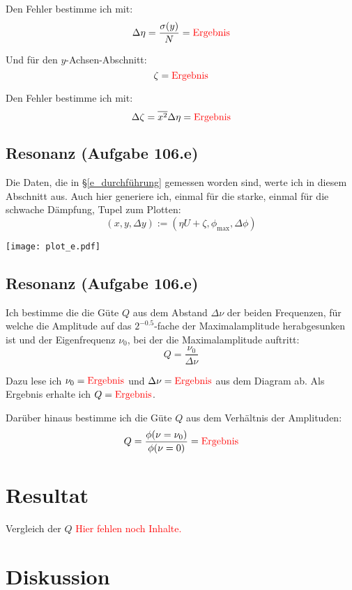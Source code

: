 \documentclass[11pt]{article}
\newcommand{\ergebnis}{\textcolor{red}{\mathrm{Ergebnis}}}
\newcommand{\fehlt}{\textcolor{red}{Hier fehlen noch Inhalte.}}
\begin{document}
Den Fehler bestimme ich mit:
\[ \Delta \eta = \frac{\sigma (y)}{N} = \ergebnis \]

Und für den $y$-Achsen-Abschnitt:
\[ \zeta = \ergebnis \]

Den Fehler bestimme ich mit:
\[ \Delta \zeta = \overline{x^2} \Delta \eta = \ergebnis \]

\subsection{Resonanz (Aufgabe 106.e)}
\label{e_auswertung}

Die Daten, die in §\ref{e_durchführung} gemessen worden sind, werte ich in
diesem Abschnitt aus. Auch hier generiere ich, einmal für die starke, einmal
für die schwache Dämpfung, Tupel zum Plotten:
\[ (x, y, \Delta y) := \left( \eta U + \zeta, \phi_\mathrm{max}, \Delta \phi \right) \]

\texttt{[image: plot\_e.pdf]}

\subsection{Resonanz (Aufgabe 106.e)}

Ich bestimme die die Güte $Q$ aus dem Abstand $\Delta \nu$ der beiden
Frequenzen, für welche die Amplitude auf das $2^{-0.5}$-fache der
Maximalamplitude herabgesunken ist und der Eigenfrequenz $\nu_0$, bei der die
Maximalamplitude auftritt:
\[ Q = \frac{\nu_0}{\Delta \nu} \]

Dazu lese ich $\nu_0 = \ergebnis$ und $\Delta \nu = \ergebnis$ aus dem Diagram
ab. Als Ergebnis erhalte ich $Q = \ergebnis$.

Darüber hinaus bestimme ich die Güte $Q$ aus dem Verhältnis der Amplituden:
\[ Q = \frac{\phi(\nu = \nu_0)}{\phi(\nu = 0)} = \ergebnis \]

\section{Resultat}

Vergleich der $Q$ \fehlt

\section{Diskussion}
\end{document}

